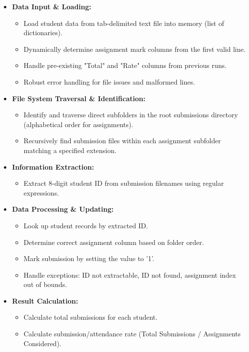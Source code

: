 \documentclass[11pt, a4paper]{article}
\begin{document}
\begin{itemize}[leftmargin=*]
    \item \textbf{Data Input \& Loading:}
    \begin{itemize}
        \item Load student data from tab-delimited text file into memory (list of dictionaries).
        \item Dynamically determine assignment mark columns from the first valid line.
        \item Handle pre-existing "Total" and "Rate" columns from previous runs.
        \item Robust error handling for file issues and malformed lines.
    \end{itemize}
\newpage
    \item \textbf{File System Traversal \& Identification:}
    \begin{itemize}
        \item Identify and traverse direct subfolders in the root submissions directory (alphabetical order for assignments).
        \item Recursively find submission files within each assignment subfolder matching a specified extension.
    \end{itemize}

    \item \textbf{Information Extraction:}
    \begin{itemize}
        \item Extract 8-digit student ID from submission filenames using regular expressions.
    \end{itemize}

    \item \textbf{Data Processing \& Updating:}
    \begin{itemize}
        \item Look up student records by extracted ID.
        \item Determine correct assignment column based on folder order.
        \item Mark submission by setting the value to '1'.
        \item Handle exceptions: ID not extractable, ID not found, assignment index out of bounds.
    \end{itemize}

    \item \textbf{Result Calculation:}
    \begin{itemize}
        \item Calculate total submissions for each student.
        \item Calculate submission/attendance rate (Total Submissions / Assignments Considered).
    \end{itemize}


\end{itemize}
\end{document}
